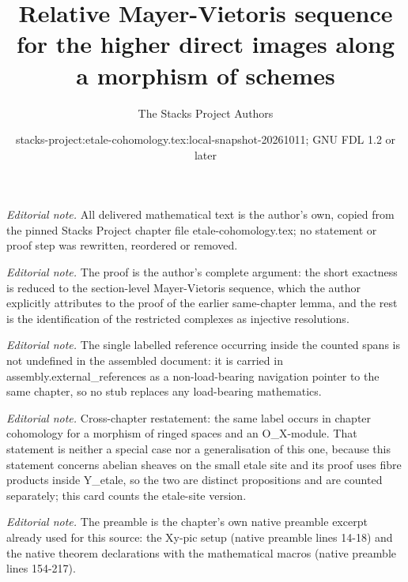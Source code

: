 \documentclass[10pt,a4paper]{amsart}
\title{Relative Mayer-Vietoris sequence for the higher direct images along a morphism of schemes}
\author{The Stacks Project Authors}
\date{stacks-project:etale-cohomology.tex:local-snapshot-20261011; GNU FDL 1.2 or later}
\theoremstyle{plain}
\theoremstyle{definition}
\theoremstyle{remark}
\numberwithin{equation}{subsection}
\begin{document}
\maketitle
\noindent\textit{Editorial note.} All delivered mathematical text is the author's own, copied from the pinned Stacks Project chapter file etale-cohomology.tex; no statement or proof step was rewritten, reordered or removed.\par\medskip
\noindent\textit{Editorial note.} The proof is the author's complete argument: the short exactness is reduced to the section-level Mayer-Vietoris sequence, which the author explicitly attributes to the proof of the earlier same-chapter lemma, and the rest is the identification of the restricted complexes as injective resolutions.\par\medskip
\noindent\textit{Editorial note.} The single labelled reference occurring inside the counted spans is not undefined in the assembled document: it is carried in assembly.external\_references as a non-load-bearing navigation pointer to the same chapter, so no stub replaces any load-bearing mathematics.\par\medskip
\noindent\textit{Editorial note.} Cross-chapter restatement: the same label occurs in chapter cohomology for a morphism of ringed spaces and an O\_X-module. That statement is neither a special case nor a generalisation of this one, because this statement concerns abelian sheaves on the small etale site and its proof uses fibre products inside Y\_etale, so the two are distinct propositions and are counted separately; this card counts the etale-site version.\par\medskip
\noindent\textit{Editorial note.} The preamble is the chapter's own native preamble excerpt already used for this source: the Xy-pic setup (native preamble lines 14-18) and the native theorem declarations with the mathematical macros (native preamble lines 154-217).\par\medskip
\end{document}

